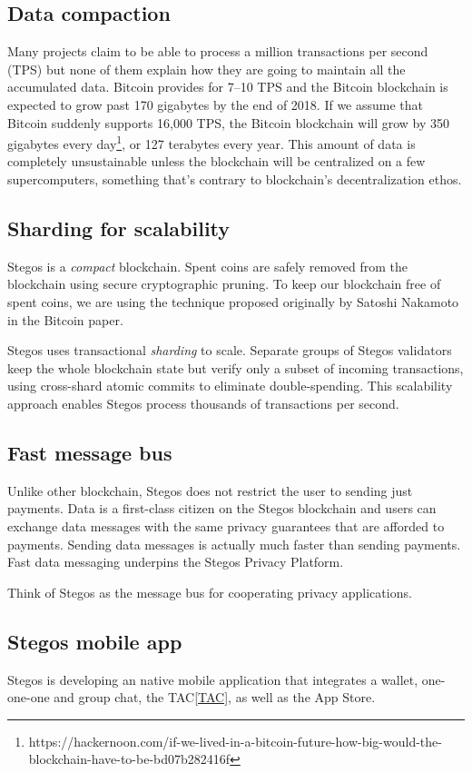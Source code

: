 \documentclass[a4paper, 10pt, conference]{ieeeconf}
\begin{document}
\subsection{Data compaction}
Many projects claim to be able to process a million transactions per second (TPS) but none of them explain how they are going to maintain all the accumulated data. Bitcoin provides for 7--10 TPS and the Bitcoin blockchain is expected to grow past 170 gigabytes by the end of 2018. If we assume that Bitcoin suddenly supports 16,000 TPS, the Bitcoin blockchain will grow by 350 gigabytes every day\footnote{https://hackernoon.com/if-we-lived-in-a-bitcoin-future-how-big-would-the-blockchain-have-to-be-bd07b282416f}, or 127 terabytes every year. This amount of data is completely unsustainable unless the blockchain will be centralized on a few supercomputers, something that’s contrary to blockchain’s decentralization ethos.

\subsection{Sharding for scalability}
Stegos is a \textit{compact} blockchain. Spent coins are safely removed from the blockchain using secure cryptographic pruning. To keep our blockchain free of spent coins, we are using the technique proposed originally by Satoshi Nakamoto in the Bitcoin paper\cite{c1}.

Stegos uses transactional \textit{sharding} to scale. Separate groups of Stegos validators keep the whole blockchain state but verify only a subset of incoming transactions, using cross-shard atomic commits to eliminate double-spending. This scalability approach enables Stegos process thousands of transactions per second.

\subsection{Fast message bus}
Unlike other blockchain, Stegos does not restrict the user to sending just payments. Data is a first-class citizen on the Stegos blockchain and users can exchange data messages with the same privacy guarantees that are afforded to payments. Sending data messages is actually much faster than sending payments. Fast data messaging underpins the Stegos Privacy Platform. 

Think of Stegos as the message bus for cooperating privacy applications.

\subsection{Stegos mobile app}
Stegos is developing an native mobile application that integrates a wallet, one-one-one and group chat, the TAC\ref{TAC}, as well as the App Store.
\end{document}
